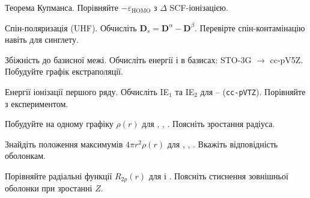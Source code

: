 \begin{tasks}
    \item Теорема Купманса.
    Порівняйте $-\varepsilon_{\text{HOMO}}$ з $\Delta$ SCF-іонізацією.


    \item Спін-поляризація (UHF).
    Обчисліть $\mathbf{D}_s = \mathbf{D}^\alpha - \mathbf{D}^\beta$. Перевірте спін-контамінацію навіть для синглету.

    \item Збіжність до базисної межі.
    Обчисліть енергії  і  в базисах: STO-3G $\to$ cc-pV5Z. Побудуйте графік екстраполяції.

    \item Енергії іонізації першого ряду.
    Обчисліть IE${}_1$ та IE${}_2$ для – (\texttt{cc-pVTZ}). Порівняйте з експериментом.



    \item Побудуйте на одному графіку $\rho(r)$ для , , . Поясніть зростання радіуса.

    \item Знайдіть положення максимумів $4\pi r^2 \rho(r)$ для , , . Вкажіть відповідність оболонкам.

    \item Порівняйте радіальні функції $R_{2p}(r)$ для  і . Поясніть стиснення зовнішньої оболонки при зростанні $Z$.

\end{tasks}

